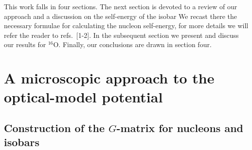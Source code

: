 This work falls in four sections. The next section is devoted to a review
of our approach
and a discussion on the self-energy of the isobar
We recast there the necessary formulae for calculating the 
nucleon self-energy, for more details we will refer the reader
to refs.\ [1-2]. In the
subsequent section we present and discuss our results for $^{16}$O. Finally,
our conclusions are drawn in section four.


\section{A microscopic approach to the optical-model potential}

\subsection{Construction of the $G$-matrix for nucleons and isobars}


